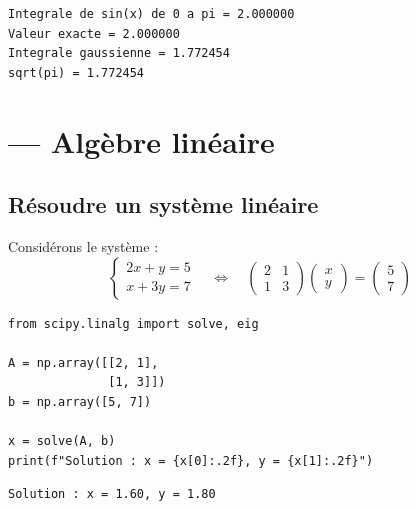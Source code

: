 \begin{codeoutput}
\begin{verbatim}
Integrale de sin(x) de 0 a pi = 2.000000
Valeur exacte = 2.000000
Integrale gaussienne = 1.772454
sqrt(pi) = 1.772454
\end{verbatim}
\end{codeoutput}

\section{ --- Alg\`ebre lin\'eaire}

\subsection{R\'esoudre un syst\`eme lin\'eaire}

Consid\'erons le syst\`eme :
\[
\begin{cases}
2x + y = 5 \\
x + 3y = 7
\end{cases}
\quad \Longleftrightarrow \quad
\begin{pmatrix} 2 & 1 \\ 1 & 3 \end{pmatrix}
\begin{pmatrix} x \\ y \end{pmatrix}
=
\begin{pmatrix} 5 \\ 7 \end{pmatrix}
\]

\begin{codeblock}[title=\textbf{Python}]
\begin{verbatim}
from scipy.linalg import solve, eig

A = np.array([[2, 1],
              [1, 3]])
b = np.array([5, 7])

x = solve(A, b)
print(f"Solution : x = {x[0]:.2f}, y = {x[1]:.2f}")
\end{verbatim}
\end{codeblock}

\begin{codeoutput}
\begin{verbatim}
Solution : x = 1.60, y = 1.80
\end{verbatim}
\end{codeoutput}

